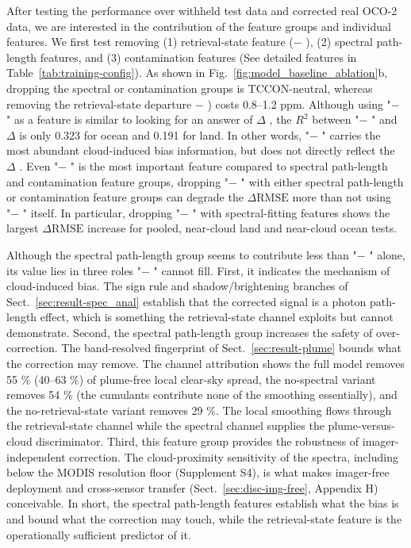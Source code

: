 After testing the performance over withheld test data and corrected real OCO-2 data, we are interested in the contribution of the feature groups and individual features. We first test removing (1) retrieval-state feature (\xcoraw − \xcoprior), (2) spectral path-length features, and (3) contamination features (See detailed features in Table~\ref{tab:training-config}). As shown in Fig.~\ref{fig:model_baseline_ablation}b, dropping the spectral or contamination groups is TCCON-neutral, whereas removing the retrieval-state departure \xcoraw − \xcoprior) costs 0.8–1.2 ppm. Although using "\xcoraw − \xcoprior" as a feature is similar to looking for an answer of $\Delta$ \xcobc, the $R^2$ between "\xcoraw − \xcoprior" and $\Delta$ \xcobc is only 0.323 for ocean and 0.191 for land. In other words, "\xcoraw − \xcoprior" carries the most abundant cloud-induced \xco bias information, but does not directly reflect the $\Delta$ \xcobc. Even "\xcoraw − \xcoprior" is the most important feature compared to spectral path-length and contamination feature groups, dropping "\xcoraw − \xcoprior" with either spectral path-length or contamination feature groups can degrade the $\Delta \mathrm{RMSE}$ more than not using "\xcoraw − \xcoprior" itself. In particular, dropping "\xcoraw − \xcoprior" with spectral-fitting features shows the largest $\Delta \mathrm{RMSE}$ increase for pooled, near-cloud land and near-cloud ocean tests.


Although the spectral path-length group seems to contribute less than "\xcoraw − \xcoprior" alone, its value lies in three roles "\xcoraw − \xcoprior" cannot fill. First, it indicates the mechanism of cloud-induced bias. The sign rule and shadow/brightening branches of Sect.~\ref{sec:result-spec_anal} establish that the corrected signal is a photon path-length effect, which is something the retrieval-state channel exploits but cannot demonstrate. Second, the spectral path-length group increases the safety of over-correction. The band-resolved fingerprint of Sect.~\ref{sec:result-plume} bounds what the correction may remove. The channel attribution shows the full model removes 55 \% (40–63 \%) of plume-free local clear-sky spread, the no-spectral variant removes 54 \% (the cumulants contribute none of the smoothing essentially), and the no-retrieval-state variant removes 29 \%. The local smoothing flows through the retrieval-state channel while the spectral channel supplies the plume-versus-cloud discriminator. Third, this feature group provides the robustness of imager-independent correction. The cloud-proximity sensitivity of the spectra, including below the MODIS resolution floor (Supplement S4), is what makes imager-free deployment and cross-sensor transfer (Sect.~\ref{sec:disc-img-free}, Appendix H) conceivable. In short, the spectral path-length features establish what the bias is and bound what the correction may touch, while the retrieval-state feature is the operationally sufficient predictor of it.






